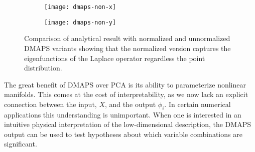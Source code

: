 \begin{figure}
  \centering
  \begin{subfigure}[t]{0.45\linewidth}
    \centering
    \texttt{[image: dmaps-non-x]}
  \end{subfigure}
  \begin{subfigure}[t]{0.45\linewidth}
    \centering
    \texttt{[image: dmaps-non-y]}
  \end{subfigure}
  \caption[Comparison of different DMAPS variants]{Comparison of analytical result with normalized and
    unnormalized DMAPS variants showing that the normalized version
    captures the eigenfunctions of the Laplace operator regardless the
    point distribution. \label{fig:dmaps-nonun-phi} }
\end{figure}

The great benefit of DMAPS over PCA is its ability to parameterize
nonlinear manifolds. This comes at the cost of interpretability, as we
now lack an explicit connection between the input, $X$, and the output
$\phi_i$. In certain numerical applications this understanding is
unimportant. When one is interested in an intuitive physical
interpretation of the low-dimensional description, the DMAPS output
can be used to test hypotheses about which variable combinations are
significant.